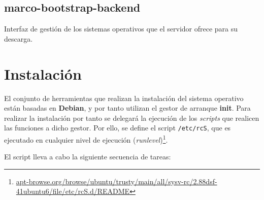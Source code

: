 \documentclass{article}
\begin{document}
\subsection{marco-bootstrap-backend}

Interfaz de gestión de los sistemas operativos que el servidor ofrece para su descarga.

\section{Instalación}

El conjunto de herramientas que realizan la instalación del sistema operativo están basadas en \textbf{Debian}, y por tanto utilizan el gestor de arranque \textbf{init}. Para realizar la instalación por tanto se delegará la ejecución de los \textit{scripts} que realicen las funciones a dicho gestor. Por ello, se define el script \texttt{/etc/rcS}, que es ejecutado en cualquier nivel de ejecución (\textit{runlevel})\footnote{\href{http://apt-browse.org/browse/ubuntu/trusty/main/all/sysv-rc/2.88dsf-41ubuntu6/file/etc/rcS.d/README}{apt-browse.org/browse/ubuntu/trusty/main/all/sysv-rc/2.88dsf-41ubuntu6/file/etc/rcS.d/README}}. 

El script lleva a cabo la siguiente secuencia de tareas:
\end{document}

